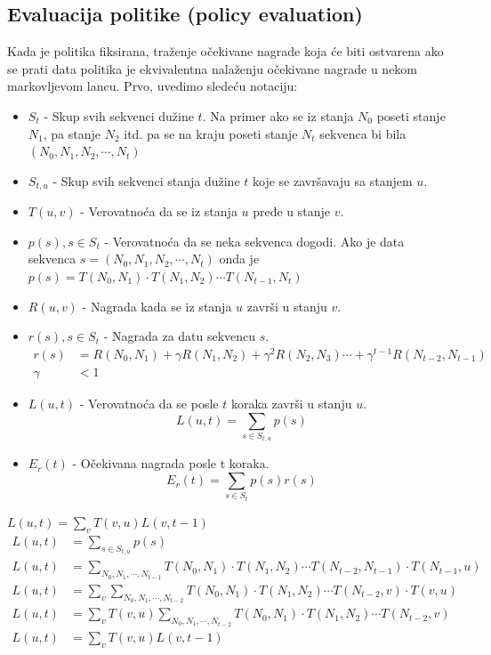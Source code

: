 \documentclass[a4paper,fleqn,12pt]{JMThesis}
\newcommand{\latin}{\fontencoding{T1}\selectfont\selectlanguage{english}}
\theoremstyle{plain}
\theoremstyle{definition}
\theoremstyle{definition}
\begin{document}
\subsection{Evaluacija politike ({\latin policy evaluation})}
Kada je politika fiksirana, traženje očekivane nagrade koja će biti ostvarena ako se prati data politika je ekvivalentna nalaženju očekivane nagrade u nekom markovljevom lancu. Prvo, uvedimo sledeću notaciju:
\begin{itemize}
	\item $S_t$ - Skup svih sekvenci dužine $t$. Na primer ako se iz stanja $N_0$ poseti stanje $N_1$, pa stanje $N_2$ itd. pa se na kraju poseti stanje $N_t$ sekvenca bi bila $(N_0, N_1, N_2, \cdots , N_t)$
 	\item $S_{t,u}$ - Skup svih sekvenci stanja dužine $t$ koje se završavaju sa stanjem $u$.
  	\item $T(u,v)$ - Verovatnoća da se iz stanja $u$ pređe u stanje $v$.
   	\item $p(s), s \in S_t$ - Verovatnoća da se neka sekvenca dogodi. Ako je data sekvenca $s=(N_0,N_1,N_2,\cdots , N_t)$ onda je $p(s) = T(N_0, N_1)\cdot T(N_1,N_2)\cdots T(N_{t-1},N_{t})$
    \item $R(u,v)$ - Nagrada kada se iz stanja $u$ završi u stanju $v$.
    \item $r(s), s \in S_t$ - Nagrada za datu sekvencu $s$. 
    \[ 
		\begin{split}
		r(s) &= R(N_0, N_1)+\gamma R(N_1,N_2) +\gamma^2 R(N_2,N_3) \cdots + \gamma^{t-1} R(N_{t-2},N_{t-1}) \\
		\gamma &< 1
		\end{split}
	\]
    \item $L(u,t)$ - Verovatnoća da se posle $t$ koraka završi u stanju $u$. 
	\[ 
		L(u,t) = \sum_{s \in S_{t,u}}p(s)
	\]
    \item $E_r(t)$ - Očekivana nagrada posle t koraka.
    \[
		E_r(t) = \sum_{s \in S_t}p(s)r(s)
	\]
\end{itemize}
\lem $L(u,t) = \sum_{v}T(v,u)L(v,t-1)$
\[
\begin{split}
	L(u,t) &= \sum_{s \in S_{t,u}}p(s)	\\
	L(u,t) &= \sum_{N_0, N_1, \cdots, N_{t-1}}T(N_0,N_1)\cdot T(N_1,N_2)\cdots T(N_{t-2},N_{t-1})\cdot T(N_{t-1},u)\\
	L(u,t) &= \sum_{v}\sum_{N_0, N_1,\cdots , N_{t-2}}T(N_0,N_1)\cdot T(N_1,N_2)\cdots T(N_{t-2},v) \cdot T(v,u)\\
	L(u,t) &= \sum_{v}T(v,u)\sum_{N_0, N_1,\cdots , N_{t-2}}T(N_0,N_1)\cdot T(N_1,N_2)\cdots T(N_{t-2},v)\\
	L(u,t) &= \sum_{v}T(v,u)L(v,t-1)
\end{split}
\]
\end{document}
